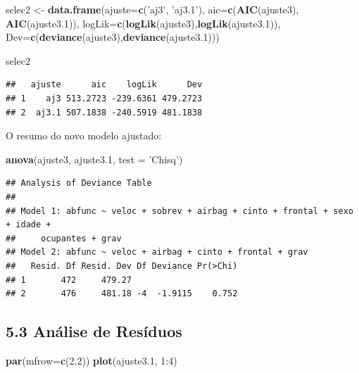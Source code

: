 \documentclass[]{article}
\newenvironment{Shaded}{\begin{snugshade}}{\end{snugshade}}
\newcommand{\KeywordTok}[1]{\textcolor[rgb]{0.13,0.29,0.53}{\textbf{{#1}}}}
\newcommand{\DataTypeTok}[1]{\textcolor[rgb]{0.13,0.29,0.53}{{#1}}}
\newcommand{\DecValTok}[1]{\textcolor[rgb]{0.00,0.00,0.81}{{#1}}}
\newcommand{\FloatTok}[1]{\textcolor[rgb]{0.00,0.00,0.81}{{#1}}}
\newcommand{\StringTok}[1]{\textcolor[rgb]{0.31,0.60,0.02}{{#1}}}
\newcommand{\NormalTok}[1]{{#1}}
\begin{document}
\begin{Shaded}
\begin{Highlighting}[]
\NormalTok{selec2 <-}\StringTok{ }\KeywordTok{data.frame}\NormalTok{(}\DataTypeTok{ajuste=}\KeywordTok{c}\NormalTok{(}\StringTok{'aj3'}\NormalTok{, }\StringTok{'aj3.1'}\NormalTok{),}
                    \DataTypeTok{aic=}\KeywordTok{c}\NormalTok{(}\KeywordTok{AIC}\NormalTok{(ajuste3), }\KeywordTok{AIC}\NormalTok{(ajuste3}\FloatTok{.1}\NormalTok{)),}
                    \DataTypeTok{logLik=}\KeywordTok{c}\NormalTok{(}\KeywordTok{logLik}\NormalTok{(ajuste3),}\KeywordTok{logLik}\NormalTok{(ajuste3}\FloatTok{.1}\NormalTok{)),}
                    \DataTypeTok{Dev=}\KeywordTok{c}\NormalTok{(}\KeywordTok{deviance}\NormalTok{(ajuste3),}\KeywordTok{deviance}\NormalTok{(ajuste3}\FloatTok{.1}\NormalTok{)))}

\NormalTok{selec2}
\end{Highlighting}
\end{Shaded}

\begin{verbatim}
##   ajuste      aic    logLik      Dev
## 1    aj3 513.2723 -239.6361 479.2723
## 2  aj3.1 507.1838 -240.5919 481.1838
\end{verbatim}

O resumo do novo modelo ajustado:

\begin{Shaded}
\begin{Highlighting}[]
\KeywordTok{anova}\NormalTok{(ajuste3, ajuste3}\FloatTok{.1}\NormalTok{, }\DataTypeTok{test =} \StringTok{'Chisq'}\NormalTok{)}
\end{Highlighting}
\end{Shaded}

\begin{verbatim}
## Analysis of Deviance Table
## 
## Model 1: abfunc ~ veloc + sobrev + airbag + cinto + frontal + sexo + idade + 
##     ocupantes + grav
## Model 2: abfunc ~ veloc + airbag + cinto + frontal + grav
##   Resid. Df Resid. Dev Df Deviance Pr(>Chi)
## 1       472     479.27                     
## 2       476     481.18 -4  -1.9115    0.752
\end{verbatim}

\subsection{\texorpdfstring{\textbf{5.3 Análise de
Resíduos}}{5.3 Análise de Resíduos}}\label{analise-de-residuos}

\begin{Shaded}
\begin{Highlighting}[]
\KeywordTok{par}\NormalTok{(}\DataTypeTok{mfrow=}\KeywordTok{c}\NormalTok{(}\DecValTok{2}\NormalTok{,}\DecValTok{2}\NormalTok{))}
\KeywordTok{plot}\NormalTok{(ajuste3}\FloatTok{.1}\NormalTok{, }\DecValTok{1}\NormalTok{:}\DecValTok{4}\NormalTok{)}
\end{Highlighting}
\end{Shaded}
\end{document}
